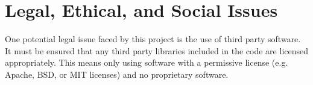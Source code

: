 \section{Legal, Ethical, and Social Issues}
\label{section:professional_issues}

One potential legal issue faced by this project is the use of third party software.
It must be ensured that any third party libraries included in the code are licensed
appropriately. This means only using software with a permissive license (e.g. Apache,
BSD, or MIT licenses) and no proprietary software.


